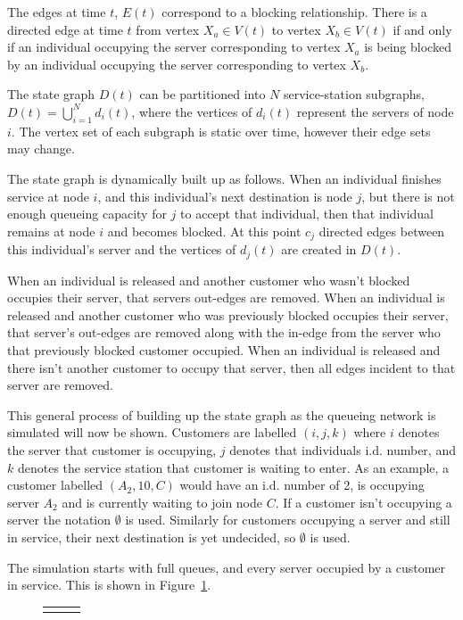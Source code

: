 \documentclass{article}
\begin{document}
The edges at time \(t\), \(E(t)\) correspond to a blocking relationship.
There is a directed edge at time \(t\) from vertex \(X_a\in V(t)\) to vertex \(X_b\in
V(t)\) if and only if an individual occupying the server corresponding to vertex
\(X_a\) is being blocked by an individual occupying the server corresponding to
vertex \(X_b\).

The state graph $D(t)$ can be partitioned into $N$ service-station subgraphs,
$D(t)=\bigcup_{i=1}^N d_i(t)$, where the vertices of $d_i(t)$ represent the servers of node $i$.
The vertex set of each subgraph is static over time, however their edge sets may
change.

The state graph is dynamically built up as follows.
When an individual finishes service at node $i$, and this individual's next destination is node $j$, but there is not enough queueing capacity for $j$ to accept that individual, then that individual remains at node $i$ and becomes blocked.
At this point $c_j$ directed edges between this individual's server and the vertices of $d_j(t)$ are created in $D(t)$.

When an individual is released and another customer who wasn't blocked occupies their server, that servers out-edges are removed.
When an individual is released and another customer who was previously blocked occupies their server, that server's out-edges are removed along with the in-edge from the server who that previously blocked customer occupied.
When an individual is released and there isn't another customer to occupy that server, then all edges incident to that server are removed.

This general process of building up the state graph as the queueing network is simulated will now be shown.
Customers are labelled $(i, j, k)$ where $i$ denotes the server that customer is occupying, $j$ denotes that individuals i.d. number, and $k$ denotes the service station that customer is waiting to enter.
As an example, a customer labelled $(A_2, 10, C)$ would have an i.d. number of 2, is occupying server $A_2$ and is currently waiting to join node $C$.
If a customer isn't occupying a server the notation $\emptyset$ is used.
Similarly for customers occupying a server and still in service, their next destination is yet undecided, so $\emptyset$ is used.

The simulation starts with full queues, and every server occupied by a customer in service. This is shown in Figure~\ref{fig:general_buildup_1}.

\begin{figure}[H]
  \begin{tabular}{ c c c }
       & \hspace{0.1\textwidth} &
       \\
  \end{tabular}
  \caption{}
  \label{fig:general_buildup_1}
\end{figure}
\end{document}
